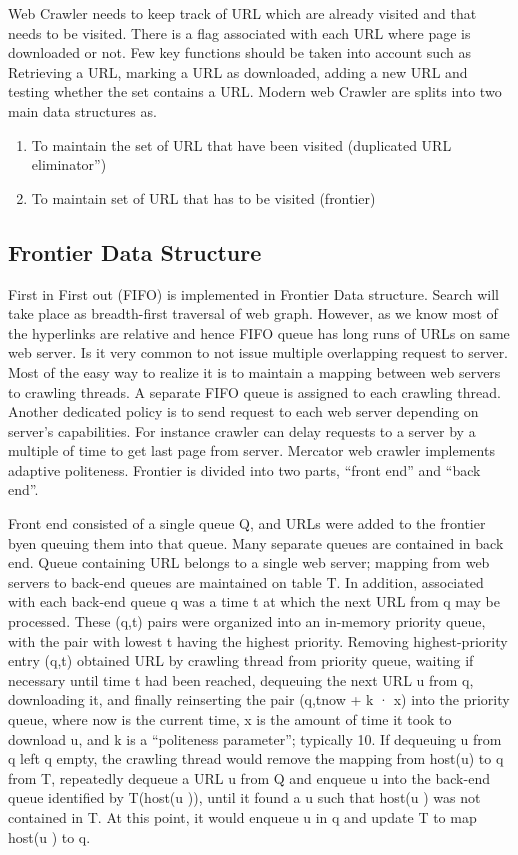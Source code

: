 \documentclass[12pt]{report}
\begin{document}
 Web Crawler needs to keep track of URL which are already visited and that needs to be visited. There is a flag associated with each URL where page is downloaded or not. Few key functions should be taken into account such as Retrieving a URL, marking a URL as downloaded, adding a new URL and testing whether the set contains a URL. Modern web Crawler are splits into two main data structures as.
 \begin{enumerate} [label=(\alph*)]
\item To maintain the set of URL that have been visited (duplicated URL eliminator”)
\item To maintain set of URL that has to be visited (frontier)
\end{enumerate}

\subsection*{Frontier Data Structure}
First in First out (FIFO) is implemented in Frontier Data structure.  Search will take place as breadth-first traversal of web graph. However, as we know most of the hyperlinks are relative and hence FIFO queue has long runs of URLs on same web server. Is it very common to not issue multiple overlapping request to server. Most of the easy way to realize it is to maintain a mapping between web servers to crawling threads. A separate FIFO queue is assigned to each crawling thread. Another dedicated policy is to send request to each web server depending on server’s capabilities. For instance crawler can delay requests to a server by a multiple of time to get last page from server. Mercator web crawler implements adaptive politeness. Frontier is divided into two parts, “front end” and “back end”.

Front end consisted of a single queue Q, and URLs were added to the frontier byen queuing them into that queue.  Many separate queues are contained in back end. Queue containing URL belongs to a single web server; mapping from web servers to back-end queues are maintained on table T. In addition, associated with each back-end queue q was a time t at which the next URL from q may be processed. These (q,t) pairs were organized into an in-memory priority queue, with the pair with lowest t having the highest priority.  Removing highest-priority entry (q,t) obtained URL by crawling thread from priority queue, waiting if necessary until time t had been reached, dequeuing the next URL u from q, downloading it, and finally reinserting the pair (q,tnow + k · x) into the priority queue, where now is the current time, x is the amount of time it took to download u, and k is a “politeness parameter”; typically 10. If dequeuing u from q left q empty, the crawling thread would remove the mapping from host(u) to q from T, repeatedly dequeue a URL u from Q and enqueue u into the back-end queue identified by T(host(u )), until it found a u such that host(u ) was not contained in T. At this point, it would enqueue u in q and update T to map host(u ) to q.
\end{document}
